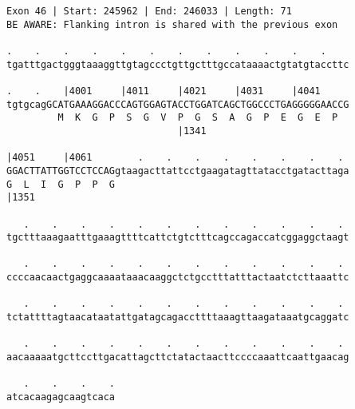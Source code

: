 \documentclass{article}
\begin{document}
\begin{Verbatim}[fontfamily=courier]
Exon 46 | Start: 245962 | End: 246033 | Length: 71
BE AWARE: Flanking intron is shared with the previous exon

.    .    .    .    .    .    .    .    .    .    .    .    
tgatttgactgggtaaaggttgtagccctgttgctttgccataaaactgtatgtaccttc

.    .    |4001     |4011     |4021     |4031     |4041     
tgtgcagGCATGAAAGGACCCAGTGGAGTACCTGGATCAGCTGGCCCTGAGGGGGAACCG
         M  K  G  P  S  G  V  P  G  S  A  G  P  E  G  E  P  
                              |1341                         

|4051     |4061        .    .    .    .    .    .    .    . 
GGACTTATTGGTCCTCCAGgtaagacttattcctgaagatagttatacctgatacttaga
G  L  I  G  P  P  G                                         
|1351                                                       

   .    .    .    .    .    .    .    .    .    .    .    . 
tgctttaaagaatttgaaagttttcattctgtctttcagccagaccatcggaggctaagt

   .    .    .    .    .    .    .    .    .    .    .    . 
ccccaacaactgaggcaaaataaacaaggctctgcctttatttactaatctcttaaattc

   .    .    .    .    .    .    .    .    .    .    .    . 
tctattttagtaacataatattgatagcagaccttttaaagttaagataaatgcaggatc

   .    .    .    .    .    .    .    .    .    .    .    . 
aacaaaaatgcttccttgacattagcttctatactaacttccccaaattcaattgaacag

   .    .    .    .
atcacaagagcaagtcaca
\end{Verbatim}
\newpage
\end{document}
